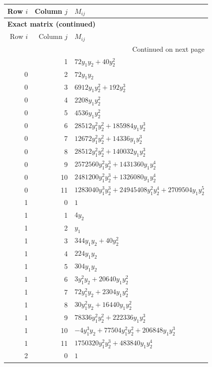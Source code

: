 \documentclass[10pt,a4paper]{article}
\begin{document}
{\small\setlength{\tabcolsep}{7pt}\begin{longtable}{rrp{125mm}}
\toprule Row $i$ & Column $j$ & $M_{ij}$\\\midrule\endfirsthead
\multicolumn{3}{l}{\textbf{Exact matrix (continued)}}\\
\toprule Row $i$ & Column $j$ & $M_{ij}$\\\midrule\endhead
\midrule\multicolumn{3}{r}{Continued on next page}\\\endfoot\bottomrule\endlastfoot
0 & 1 & $72 y_{1} y_{2} + 40 y_{2}^{2}$\\
0 & 2 & $72 y_{1} y_{2}$\\
0 & 3 & $6912 y_{1} y_{2}^{2} + 192 y_{2}^{3}$\\
0 & 4 & $2208 y_{1} y_{2}^{2}$\\
0 & 5 & $4536 y_{1} y_{2}^{2}$\\
0 & 6 & $28512 y_{1}^{2} y_{2}^{2} + 185984 y_{1} y_{2}^{3}$\\
0 & 7 & $12672 y_{1}^{2} y_{2}^{2} + 14336 y_{1} y_{2}^{3}$\\
0 & 8 & $28512 y_{1}^{2} y_{2}^{2} + 140032 y_{1} y_{2}^{3}$\\
0 & 9 & $2572560 y_{1}^{2} y_{2}^{3} + 1431360 y_{1} y_{2}^{4}$\\
0 & 10 & $2481200 y_{1}^{2} y_{2}^{3} + 1326080 y_{1} y_{2}^{4}$\\
0 & 11 & $1283040 y_{1}^{3} y_{2}^{3} + 24945408 y_{1}^{2} y_{2}^{4} + 2709504 y_{1} y_{2}^{5}$\\
1 & 0 & $1$\\
1 & 1 & $4 y_{2}$\\
1 & 2 & $y_{1}$\\
1 & 3 & $344 y_{1} y_{2} + 40 y_{2}^{2}$\\
1 & 4 & $224 y_{1} y_{2}$\\
1 & 5 & $304 y_{1} y_{2}$\\
1 & 6 & $3 y_{1}^{2} y_{2} + 20640 y_{1} y_{2}^{2}$\\
1 & 7 & $72 y_{1}^{2} y_{2} + 2304 y_{1} y_{2}^{2}$\\
1 & 8 & $30 y_{1}^{2} y_{2} + 16440 y_{1} y_{2}^{2}$\\
1 & 9 & $78336 y_{1}^{2} y_{2}^{2} + 222336 y_{1} y_{2}^{3}$\\
1 & 10 & $- 4 y_{1}^{3} y_{2} + 77504 y_{1}^{2} y_{2}^{2} + 206848 y_{1} y_{2}^{3}$\\
1 & 11 & $1750320 y_{1}^{2} y_{2}^{3} + 483840 y_{1} y_{2}^{4}$\\
2 & 0 & $1$\\

\end{longtable}}
\end{document}
